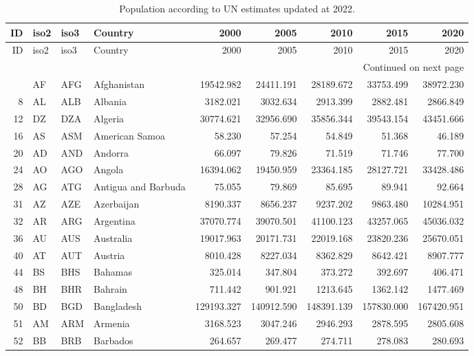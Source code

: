 {\tiny
\begin{longtable}{rlllrrrrr}
\caption{Population according to UN estimates updated at 2022.\label{tab:unpop}}
\toprule
 ID & iso2 & iso3 & Country & 2000 & 2005 & 2010 & 2015 & 2020 \\
\midrule
\endfirsthead

\toprule
 ID & iso2 & iso3 & Country & 2000 & 2005 & 2010 & 2015 & 2020 \\
\midrule
\endhead
\midrule
\multicolumn{9}{r}{{Continued on next page}} \\
\midrule
\endfoot

\bottomrule
\endlastfoot
 4 & AF & AFG & Afghanistan & 19542.982 & 24411.191 & 28189.672 & 33753.499 & 38972.230 \\
 8 & AL & ALB & Albania & 3182.021 & 3032.634 & 2913.399 & 2882.481 & 2866.849 \\
 12 & DZ & DZA & Algeria & 30774.621 & 32956.690 & 35856.344 & 39543.154 & 43451.666 \\
 16 & AS & ASM & American Samoa & 58.230 & 57.254 & 54.849 & 51.368 & 46.189 \\
 20 & AD & AND & Andorra & 66.097 & 79.826 & 71.519 & 71.746 & 77.700 \\
 24 & AO & AGO & Angola & 16394.062 & 19450.959 & 23364.185 & 28127.721 & 33428.486 \\
 28 & AG & ATG & Antigua and Barbuda & 75.055 & 79.869 & 85.695 & 89.941 & 92.664 \\
 31 & AZ & AZE & Azerbaijan & 8190.337 & 8656.237 & 9237.202 & 9863.480 & 10284.951 \\
 32 & AR & ARG & Argentina & 37070.774 & 39070.501 & 41100.123 & 43257.065 & 45036.032 \\
 36 & AU & AUS & Australia & 19017.963 & 20171.731 & 22019.168 & 23820.236 & 25670.051 \\
 40 & AT & AUT & Austria & 8010.428 & 8227.034 & 8362.829 & 8642.421 & 8907.777 \\
 44 & BS & BHS & Bahamas & 325.014 & 347.804 & 373.272 & 392.697 & 406.471 \\
 48 & BH & BHR & Bahrain & 711.442 & 901.921 & 1213.645 & 1362.142 & 1477.469 \\
 50 & BD & BGD & Bangladesh & 129193.327 & 140912.590 & 148391.139 & 157830.000 & 167420.951 \\
 51 & AM & ARM & Armenia & 3168.523 & 3047.246 & 2946.293 & 2878.595 & 2805.608 \\
 52 & BB & BRB & Barbados & 264.657 & 269.477 & 274.711 & 278.083 & 280.693 \\

\end{longtable}}
